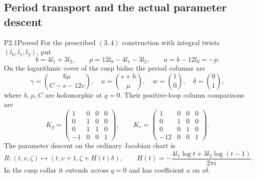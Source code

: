 \subsection{Period transport and the actual parameter descent}

\begin{statement}{P2.1}{Proved}
For the prescribed $(3,4)$ construction with integral twists $(l_0,l_1,l_2)$, put
\[
 b=4l_1+3l_2,\qquad p=12l_0-4l_1-3l_2,\qquad a=b-12l_0=-p.
\]
On the logarithmic cover of the cusp bidisc the period columns are
\[
 \gamma=\binom{6\mu}{C-s-12v},\quad
 u=\binom{s+h}{\mu},\quad w=\binom10,\quad\delta=\binom01,
\]
where $h,\mu,C$ are holomorphic at $q=0$. Their positive-loop column comparisons are
\[
 K_q=\begin{pmatrix}1&0&0&0\\0&1&0&0\\0&1&1&0\\-1&0&0&1\end{pmatrix},\qquad
 K_r=\begin{pmatrix}1&0&0&0\\0&1&0&0\\0&0&1&0\\-12&0&0&1\end{pmatrix}.
\]
The parameter descent on the ordinary Jacobian chart is
\begin{equation}\label{eq:P2H}
 R:(t,v,\zeta)\longmapsto(t,v+1,\zeta+H(t)\delta),\qquad
 H(t)=-\frac{4l_1\log t+3l_2\log(t-1)}{2\pi i}.
\end{equation}
In the cusp collar it extends across $q=0$ and has coefficient $a$ on $s\delta$.
\end{statement}
